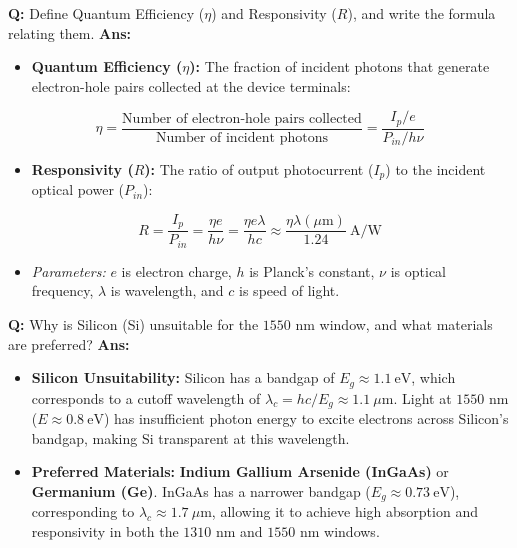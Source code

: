 \documentclass[10pt,a4paper,twocolumn]{article}
\begin{document}
\begin{tcolorbox}[
  colback=white,
  colframe=UnitColorFour,
  colbacktitle=gray!10!white,
  coltitle=black,
  fonttitle=\bfseries\sffamily\small,
  title={Unit IV $\bullet$ Card 4: Quantum Efficiency \& Responsivity},
  boxrule=1.2pt,
  arc=2mm,
  outer arc=2mm,
  boxsep=1.5mm,
  top=1mm,
  bottom=1mm,
  left=1.5mm,
  right=1.5mm,
  before skip=2.5mm,
  after skip=2.5mm
]
\textbf{Q:} Define Quantum Efficiency ($\eta$) and Responsivity ($R$), and write the formula relating them.
\tcbline
\textbf{Ans:} \begin{itemize}
  \item   \textbf{Quantum Efficiency ($\eta$):} The fraction of incident photons that generate electron-hole pairs collected at the device terminals:
\end{itemize}
        \[ \eta = \frac{\text{Number of electron-hole pairs collected}}{\text{Number of incident photons}} = \frac{I_p / e}{P_{in} / h\nu} \]
\begin{itemize}
  \item   \textbf{Responsivity ($R$):} The ratio of output photocurrent ($I_p$) to the incident optical power ($P_{in}$):
\end{itemize}
        \[ R = \frac{I_p}{P_{in}} = \frac{\eta e}{h\nu} = \frac{\eta e \lambda}{hc} \approx \frac{\eta \lambda(\mu\text{m})}{1.24}\ \text{A/W} \]
\begin{itemize}
  \item   \textit{Parameters:} $e$ is electron charge, $h$ is Planck's constant, $\nu$ is optical frequency, $\lambda$ is wavelength, and $c$ is speed of light.
\end{itemize}
\end{tcolorbox}


\begin{tcolorbox}[
  colback=white,
  colframe=UnitColorFour,
  colbacktitle=gray!10!white,
  coltitle=black,
  fonttitle=\bfseries\sffamily\small,
  title={Unit IV $\bullet$ Card 5: Detector Materials \& the $1550\text{ nm}$ Window},
  boxrule=1.2pt,
  arc=2mm,
  outer arc=2mm,
  boxsep=1.5mm,
  top=1mm,
  bottom=1mm,
  left=1.5mm,
  right=1.5mm,
  before skip=2.5mm,
  after skip=2.5mm
]
\textbf{Q:} Why is Silicon (Si) unsuitable for the $1550\text{ nm}$ window, and what materials are preferred?
\tcbline
\textbf{Ans:} \begin{itemize}
  \item   \textbf{Silicon Unsuitability:} Silicon has a bandgap of $E_g \approx 1.1\ \text{eV}$, which corresponds to a cutoff wavelength of $\lambda_c = hc/E_g \approx 1.1\ \mu\text{m}$. Light at $1550\text{ nm}$ ($E \approx 0.8\ \text{eV}$) has insufficient photon energy to excite electrons across Silicon's bandgap, making Si transparent at this wavelength.
  \item   \textbf{Preferred Materials:} \textbf{Indium Gallium Arsenide (InGaAs)} or \textbf{Germanium (Ge)}. InGaAs has a narrower bandgap ($E_g \approx 0.73\ \text{eV}$), corresponding to $\lambda_c \approx 1.7\ \mu\text{m}$, allowing it to achieve high absorption and responsivity in both the $1310\text{ nm}$ and $1550\text{ nm}$ windows.
\end{itemize}
\end{tcolorbox}
\end{document}
